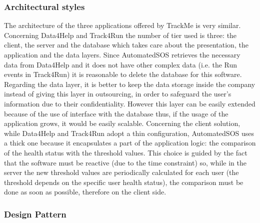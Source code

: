 \documentclass[a4paper]{article}
\begin{document}
\subsubsection{Architectural styles}
The architecture of the three applications offered by TrackMe is very similar.
Concerning Data4Help and Track4Run the number of tier used is three: the client, the server and the database which takes care about the presentation, the application and the data layers.
Since AutomatedSOS retrieves the necessary data from Data4Help and it does not have other complex data (i.e. the Run events in Track4Run) it is reasonable to delete the database for this software.
Regarding the data layer, it is better to keep the data storage inside the company instead of giving this layer in outsourcing, in order to safeguard the user's information due to their confidentiality. However this layer can be easily extended because of the use of interface with the database thus, if the usage of the application grows, it would be easily scalable. 
Concerning the client solution, while Data4Help and Track4Run adopt a thin configuration, AutomatedSOS uses a thick one because it encapsulates a part of the application logic: the comparison of the health status with the threshold values.
This choice is guided by the fact that the software must be reactive (due to the time constraint) so, while in the server the new threshold values are periodically calculated for each user (the threshold depends on the specific user health status), the comparison must be done as soon as possible, therefore on the client side.


\subsubsection{Design Pattern}
\end{document}
